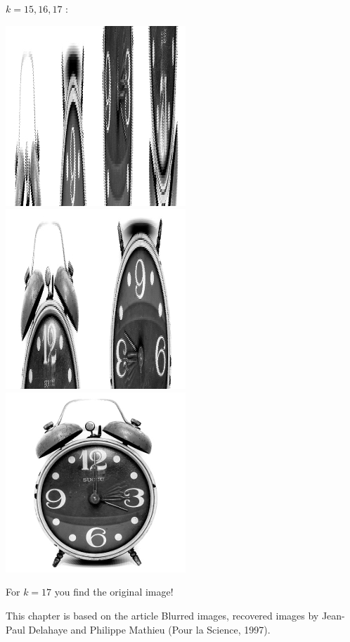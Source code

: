 \documentclass[11pt,class=report,crop=false]{standalone}
\begin{document}
\begin{activite}
$k=15,16,17$ :
\begin{center}
\includegraphics[scale=\myscale,scale=0.4]{images_chapter/clock_gimp_new_baker_15.png}\qquad
\includegraphics[scale=\myscale,scale=0.4]{images_chapter/clock_gimp_new_baker_16.png}\qquad
\includegraphics[scale=\myscale,scale=0.4]{images_chapter/clock_gimp_new_baker_17.png}
\end{center}

For $k=17$ you find the original image!

\end{activite}


This chapter is based on the article \og{}Blurred images, recovered images\fg{} by Jean-Paul Delahaye and Philippe Mathieu (Pour la Science, 1997).
\end{document}
